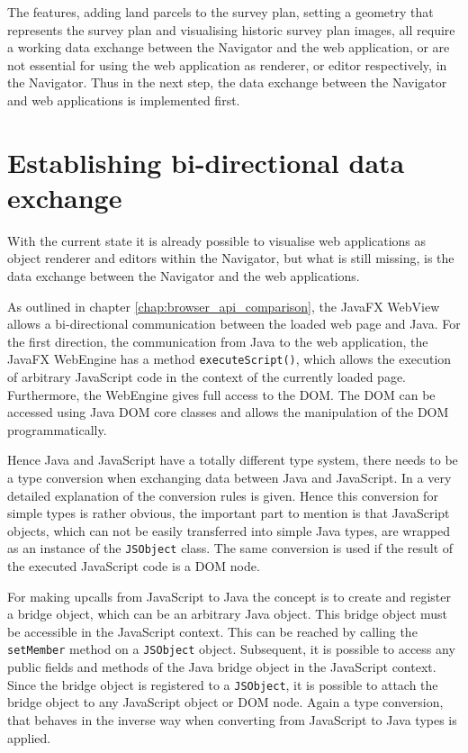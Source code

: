 The features, adding land parcels to the survey plan, setting a geometry that represents the survey plan and visualising historic survey plan images, all require a working data exchange between the Navigator and the web application, or are not essential for using the web application as renderer, or editor respectively, in the Navigator. 
Thus in the next step, the data exchange between the Navigator and web applications is implemented first.

\section{Establishing bi-directional data exchange}


With the current state it is already possible to visualise web applications as object renderer and editors within the Navigator, but what is still missing, is the data exchange between the Navigator and the web applications.
 
As outlined in chapter \ref{chap:browser_api_comparison}, the JavaFX WebView allows a bi-directional communication between the loaded web page and Java.
For the first direction, the communication from Java to the web application, the JavaFX WebEngine has a method \texttt{executeScript()}, which allows the execution of arbitrary JavaScript code in the  context of the currently loaded page.
Furthermore, the WebEngine gives full access to the DOM.
The DOM can be accessed using Java DOM core classes and allows the manipulation of the DOM programmatically.
 
Hence Java and JavaScript have a totally different type system, there needs to be a type conversion when exchanging data between Java and JavaScript.
In \autocite{impl:java2js-data-conversion}  a very detailed explanation of the conversion rules is given.
Hence this conversion for simple types is rather obvious, the important part to mention is that JavaScript objects, which can not be easily transferred into simple Java types, are wrapped as an instance of the \texttt{JSObject} class.
The same conversion is used if the result of the executed JavaScript code is a DOM node.

For making upcalls from JavaScript to Java the concept is to create and register a bridge object, which can be an arbitrary Java object.
This bridge object must be accessible in the JavaScript context. 
This can be reached by calling the \texttt{setMember} method on a \texttt{JSObject} object.
Subsequent, it is possible to access any public fields and methods of the Java bridge object in the JavaScript context.
Since the bridge object is registered to a \texttt{JSObject}, it is possible to attach the bridge object to any JavaScript object or DOM node.
Again a type conversion, that behaves in the inverse way when converting from JavaScript to Java types is applied.

